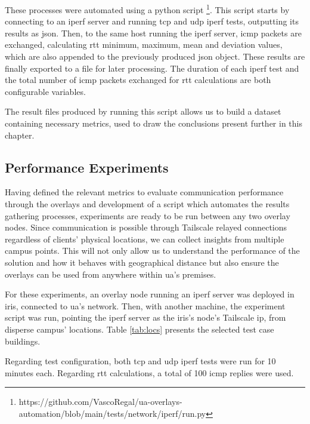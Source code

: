 \documentclass[11pt,twoside,a4paper]{report}
\begin{document}
These processes were automated using a python script \footnote{https://github.com/VascoRegal/ua-overlays-automation/blob/main/tests/network/iperf/run.py}. This script starts by connecting to an iperf server and running \ac{tcp} and \ac{udp} iperf tests, outputting its results as \ac{json}. Then, to the same host running the iperf server, \ac{icmp} packets are exchanged, calculating \ac{rtt} minimum, maximum, mean and deviation values, which are also appended to the previously produced \ac{json} object. These results are finally exported to a file for later processing. The duration of each iperf test and the total number of \ac{icmp} packets exchanged for \ac{rtt} calculations are both configurable variables.

The result files produced by running this script allows us to build a dataset containing necessary metrics, used to draw the conclusions present further in this chapter.

\subsection{Performance Experiments}

Having defined the relevant metrics to evaluate communication performance through the overlays and development of a script which automates the results gathering processes, experiments are ready to be run between any two overlay nodes. Since communication is possible through Tailscale relayed connections regardless of clients' physical locations, we can collect insights from multiple campus points. This will not only allow us to understand the performance of the solution and how it behaves with geographical distance but also ensure the overlays can be used from anywhere within \ac{ua}'s premises.

For these experiments, an overlay node running an iperf server was deployed in \ac{iris}, connected to \ac{ua}'s network. Then, with another machine, the experiment script was run, pointing the iperf server as the \ac{iris}'s node's Tailscale \ac{ip}, from disperse campus' locations. Table \ref{tab:locs} presents the selected test case buildings.

Regarding test configuration, both \ac{tcp} and \ac{udp} iperf tests were run for 10 minutes each. Regarding \ac{rtt} calculations, a total of 100 \ac{icmp} replies were used.
\end{document}
